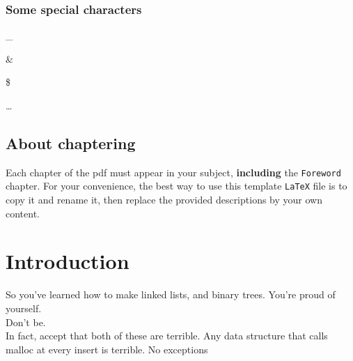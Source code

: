 \documentclass{42-en}
\begin{document}
        \newpage


        \subsection{Some special characters}

            \begin{description}\itemsep1pt
                \item [Underscore:] \_
                \item [Ampersand:] \&
                \item [Dollar:] \$
                \item [Elipsis:] \dots
            \end{description}


    \section{About chaptering}

    Each chapter of the pdf must appear in your subject,
    \textbf{including} the \texttt{Foreword} chapter. For your
    convenience, the best way to use this template \texttt{LaTeX} file is
    to copy it and rename it, then replace the provided descriptions by
    your own content.\\


\chapter{Introduction}

    So you've learned how to make linked lists, and binary trees. You're proud of yourself.\\

    Don't be.\\

    In fact, accept that both of these are terrible. Any data structure that calls
    malloc at every insert is terrible. No exceptions\\
\end{document}
